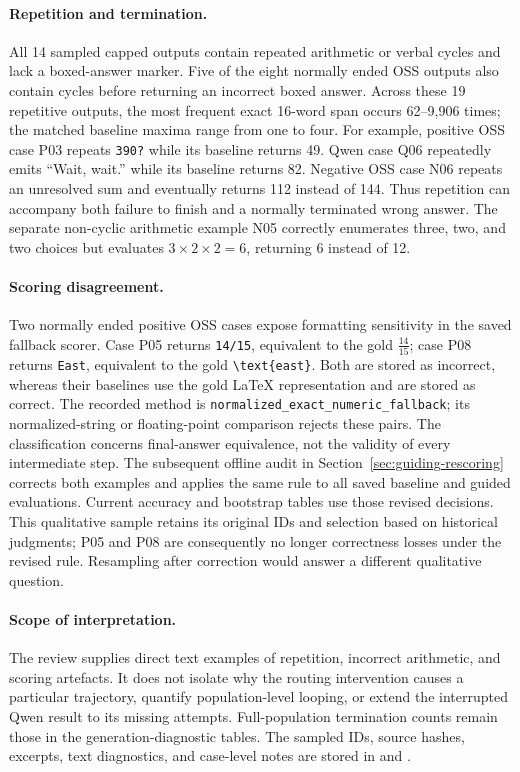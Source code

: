 \paragraph{Repetition and termination.}
All 14 sampled capped outputs contain repeated arithmetic or verbal
cycles and lack a boxed-answer marker. Five of the eight normally ended
OSS outputs also contain cycles before returning an incorrect boxed
answer. Across these 19 repetitive outputs, the most frequent exact
16-word span occurs 62--9,906 times; the matched baseline maxima range
from one to four. For example, positive OSS case P03 repeats
\texttt{390?} while its baseline returns 49. Qwen case Q06 repeatedly
emits ``Wait, wait.'' while its baseline returns 82. Negative OSS case
N06 repeats an unresolved sum and eventually returns 112 instead of 144.
Thus repetition can accompany both failure to finish and a normally
terminated wrong answer. The separate non-cyclic arithmetic example N05
correctly enumerates three, two, and two choices but evaluates
$3\times2\times2=6$, returning 6 instead of 12.

\paragraph{Scoring disagreement.}
Two normally ended positive OSS cases expose formatting sensitivity in
the saved fallback scorer. Case P05 returns \texttt{14/15}, equivalent
to the gold $\frac{14}{15}$; case P08 returns \texttt{East}, equivalent
to the gold \verb|\text{east}|. Both are stored as incorrect, whereas
their baselines use the gold LaTeX representation and are stored as correct.
The recorded method is \texttt{normalized\_exact\_numeric\_fallback};
its normalized-string or floating-point comparison rejects these pairs.
The classification concerns final-answer equivalence, not the validity
of every intermediate step. The subsequent offline audit in
Section~\ref{sec:guiding-rescoring} corrects both examples and applies the
same rule to all saved baseline and guided evaluations. Current accuracy
and bootstrap tables use those revised decisions. This qualitative sample
retains its original IDs and selection based on historical judgments;
P05 and P08 are consequently no longer correctness losses under the
revised rule. Resampling after correction would answer a different
qualitative question.

\paragraph{Scope of interpretation.}
The review supplies direct text examples of repetition, incorrect arithmetic,
and scoring artefacts. It does not isolate why the routing intervention
causes a particular trajectory, quantify population-level looping, or
extend the interrupted Qwen result to its missing attempts. Full-population
termination counts remain those in the generation-diagnostic tables.
The sampled IDs, source hashes, excerpts, text diagnostics, and case-level
notes are stored in  and
.
